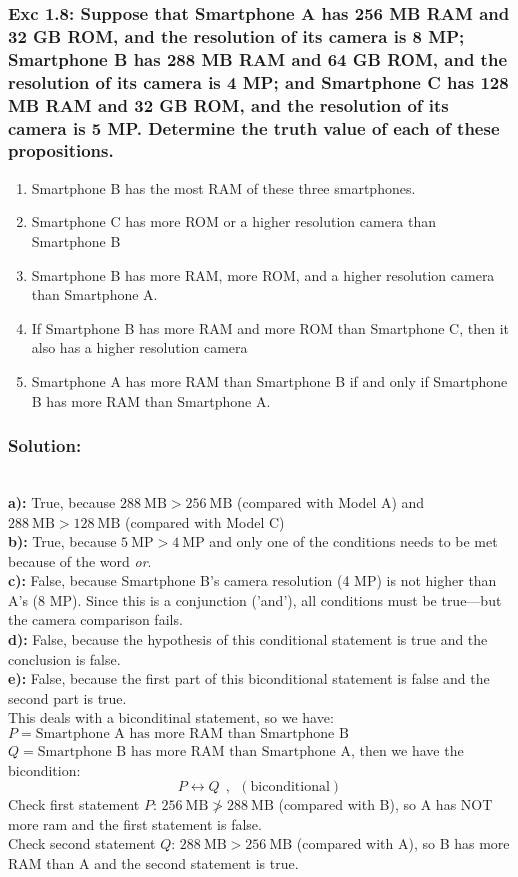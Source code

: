 \subsubsection*{Exc 1.8: Suppose that Smartphone A has 256 MB RAM and
32 GB ROM, and the resolution of its camera is 8 MP;
Smartphone B has 288 MB RAM and 64 GB ROM, and
the resolution of its camera is 4 MP; and Smartphone C
has 128 MB RAM and 32 GB ROM, and the resolution
of its camera is 5 MP. Determine the truth value of each
of these propositions.}
\begin{enumerate}[label=(\alph*)]
\item Smartphone B has the most RAM of these three
smartphones.
\item Smartphone C has more ROM or a higher resolution
camera than Smartphone B
\item Smartphone B has more RAM, more ROM, and a
higher resolution camera than Smartphone A.
\item If Smartphone B has more RAM and more ROM than
Smartphone C, then it also has a higher resolution
camera
\item Smartphone A has more RAM than Smartphone B if
and only if Smartphone B has more RAM than Smartphone A.
\end{enumerate}
\subsubsection*{Solution:}
\\
\textbf{a):} True, because $288 \ \text{MB} > 256 \ \text{MB}$ (compared with Model A) and $288 \ \text{MB} > 128 \ \text{MB}$ (compared with Model C)
\\ \textbf{b):} True, because $5 \ \text{MP} > 4 \ \text{MP}$ and only one of the conditions needs to be met because of the word \textit{or}.
\\ \textbf{c):} False, because Smartphone B’s camera resolution (4 MP) is not higher than A’s (8 MP). Since this is a conjunction ('and'), all conditions must be true—but the camera comparison fails.
\\ \textbf{d):} False, because the hypothesis of this conditional statement is true and the conclusion is false.
\\ \textbf{e):} False, because the first part of this biconditional statement is false and the second part is true.
\\ This deals with a biconditinal statement, so we have:
$P = \text{Smartphone A has more RAM than Smartphone B}$
\\ $Q = \text{Smartphone B has more RAM than Smartphone A}$, then we have the bicondition:
\begin{equation*}
P \leftrightarrow Q \ \ , \ \ (\text{biconditional})
\end{equation*}
Check first statement $P$: $256 \ \text{MB} \not> 288 \ \text{MB}$ (compared with B), so A has NOT more ram and the first statement is false. \\
Check second statement $Q$: $288 \ \text{MB} > 256 \ \text{MB}$ (compared with A), so B has more RAM than A and the second statement is true.

